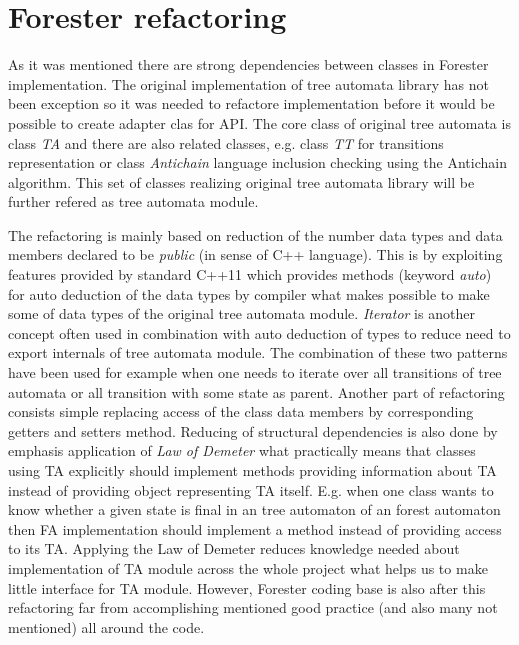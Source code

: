 \section{Forester refactoring}
\label{sec:forester_prep}

As it was mentioned there are strong dependencies between classes in Forester implementation.
The original implementation of tree automata library has not been exception so it was needed
to refactore implementation before it would be possible to create adapter clas for \vata API.
The core class of original tree automata is class \emph{TA} and there are also related classes,
e.g. class \emph{TT} for transitions representation or class \emph{Antichain} language inclusion checking using the Antichain algorithm.
This set of classes realizing original tree automata library will be further refered as tree automata module.

The refactoring is mainly based on reduction of the number data types and data members declared
to be \emph{public} (in sense of C++ language).
This is by exploiting features provided by standard C++11 \cite{c++11} which provides methods (keyword \emph{auto})
for auto deduction of the data types by compiler what makes possible to make some of data types of the original tree automata module.
\emph{Iterator} is another concept often used in combination with auto deduction of types to reduce need to export internals of tree automata module.
The combination of these two patterns have been used for example when one needs to iterate over all transitions of tree automata or all transition with some
state as parent.
Another part of refactoring consists simple replacing access of the class data members by corresponding getters and setters method.
Reducing of structural dependencies is also done by emphasis application of \emph{Law of Demeter} \cite{something} what practically
means that classes using TA explicitly should implement methods providing information about TA instead of providing object representing TA itself.
E.g. when one class wants to know whether a given state is final in an tree automaton of an forest automaton then FA implementation should
implement a method instead of providing access to its TA.
Applying the Law of Demeter reduces knowledge needed about implementation of TA module across the whole project what
helps us to make little interface for TA module.
However, Forester coding base is also after this refactoring far from accomplishing mentioned good practice (and also many not mentioned) all around the code.

